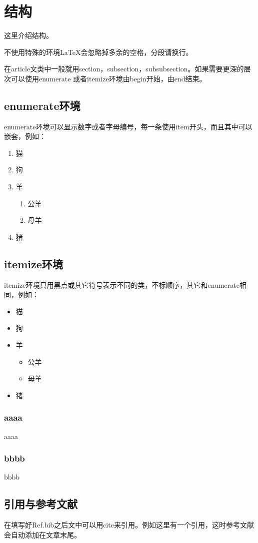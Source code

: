 \section{结构}
这里介绍结构。

不使用特殊的环境\LaTeX 会忽略掉多余的空格，分段请换行。
 
在article文类中一般就用section，subsection，subsubsection。如果需要更深的层次可以使用enumerate 或者itemize环境{由begin开始，由end结束}。



\subsection{enumerate环境}

enumerate环境可以显示数字或者字母编号，每一条使用item开头，而且其中可以嵌套，例如：
\begin{enumerate}
  \item 猫
  \item 狗
  \item 羊
  \begin{enumerate}
    \item 公羊
    \item 母羊
  \end{enumerate}
  \item 猪
\end{enumerate}

\subsection{itemize环境}

itemize环境只用黑点或其它符号表示不同的类，不标顺序，其它和enumerate相同，例如：

\begin{itemize}
  \item 猫
  \item 狗
  \item 羊
  \begin{itemize}
    \item 公羊
    \item 母羊
  \end{itemize}
  \item 猪
\end{itemize}

\subsubsection{aaaa}

aaaa

\subsubsection{bbbb}

bbbb

\subsection{引用与参考文献}
在填写好Ref.bib之后文中可以用cite来引用。例如这里有一个引用\cite{00-el-yariv-relation-coup}，这时参考文献会自动添加在文章末尾。
